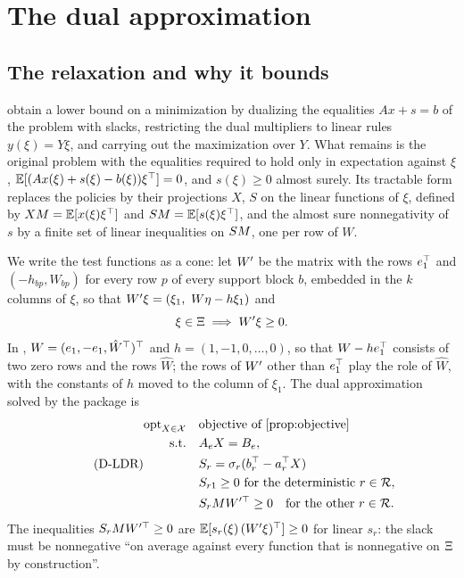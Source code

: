 \section{The dual approximation}
\label{sec:dual}

\subsection{The relaxation and why it bounds}

\citet[Section~2.3]{KWG2011} obtain a lower bound on a minimization by dualizing the equalities $Ax + s = b$ of the problem with slacks,
restricting the dual multipliers to linear rules $y(\xi) = Y\xi$, and carrying out the maximization over $Y$.
What remains is the original problem with the equalities required to hold only in expectation against $\xi$,
$\mathbb{E}[(Ax(\xi) + s(\xi) - b(\xi))\xi^\top] = 0$, and $s(\xi) \ge 0$ almost surely.
Its tractable form \citep[(2.8) and (4.6)]{KWG2011} replaces the policies by their projections $X$, $S$ on the linear functions of $\xi$,
defined by $XM = \mathbb{E}[x(\xi)\xi^\top]$ and $SM = \mathbb{E}[s(\xi)\xi^\top]$,
and the almost sure nonnegativity of $s$ by a finite set of linear inequalities on $SM$, one per row of $W$.

We write the test functions as a cone:
let $W'$ be the matrix with the rows $e_1^\top$ and $(-h_{bp}, W_{bp})$ for every row $p$ of every support block $b$, embedded in the $k$ columns of $\xi$,
so that $W'\xi = (\xi_1,\ W\eta - h\xi_1)$ and
\[
\xi \in \Xi \implies W'\xi \ge 0.
\]
In \citet[(2.1b)]{KWG2011}, $W = (e_1, -e_1, \hat W^\top)^\top$ and $h = (1, -1, 0, \dots, 0)$, so that $W - he_1^\top$ consists of two zero rows and the rows $\hat W$;
the rows of $W'$ other than $e_1^\top$ play the role of $\hat W$, with the constants of $h$ moved to the column of $\xi_1$.
The dual approximation solved by the package is
\begin{equation}
\label{eq:DLDR}
\tag{D-LDR}
\begin{aligned}
\opt_{X \in \Rules} \quad & \text{objective of \cref{prop:objective}} \\
\text{s.t.} \quad & A_e X = B_e, \\
& S_r = \sigma_r(b_r^\T - a_r^\T X) \\
& S_{r1} \ge 0 \text{ for the deterministic } r \in \Rows,\\
& S_r \Mom \Wp^\T \ge 0 \quad \text{for the other } r \in \Rows.
\end{aligned}
\end{equation}
The inequalities $S_rMW'^\top \ge 0$ are $\mathbb{E}[s_r(\xi)\,(W'\xi)^\top] \ge 0$ for linear $s_r$:
the slack must be nonnegative ``on average against every function that is nonnegative on $\Xi$ by construction''.

